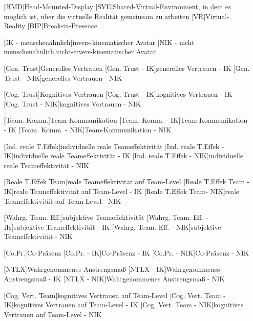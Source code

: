 \begin{acronym}
	[HMD]{Head-Mounted-Display}
	[SVE]{Shared-Virtual-Environment, in dem es möglich ist, über die virtuelle Realität gemeinsam zu arbeiten}
	[VR]{Virtual-Reality}
	[BIP]{Break-in-Presence}
	
	[IK - menschenähnlich]{invers-kinematischer Avatar}
	[NIK - nicht menschenähnlich]{nicht-invers-kinematischer Avatar}
	
	[Gen. Trust]{Generelles Vertrauen}
	[Gen. Trust - IK]{generelles Vertrauen - IK}
	[Gen. Trust - NIK]{generelles Vertrauen - NIK}
	
	[Cog. Trust]{Kognitives Vertrauen}
	[Cog. Trust - IK]{kognitives Vertrauen - IK}
	[Cog. Trust - NIK]{kognitives Vertrauen - NIK}
	
	[Team. Komm.]{Team-Kommunikation}
	[Team. Komm. - IK]{Team-Kommunikation - IK}
	[Team. Komm. - NIK]{Team-Kommunikation - NIK}
	
	[Ind. reale T.Effek]{individuelle reale Teameffektivität}
	[Ind. reale T.Effek - IK]{individuelle reale Teameffektivität - IK}
	[Ind. reale T.Effek - NIK]{individuelle reale Teameffektivität - NIK}	
	
	[Reale T.Effek Team]{reale Teameffektivität auf Team-Level}
	[Reale T.Effek Team - IK]{reale Teameffektivität auf Team-Level - IK}
	[Reale T.Effek Team- NIK]{reale Teameffektivität auf Team-Level - NIK}
	
	[Wahrg. Team. Eff.]{subjektive Teameffektivität}
	[Wahrg. Team. Eff. - IK]{subjektive Teameffektivität - IK}
	[Wahrg. Team. Eff. - NIK]{subjektive Teameffektivität - NIK}
	
	[Co.Pr.]{Co-Präsenz}
	[Co.Pr. - IK]{Co-Präsenz - IK}
	[Co.Pr. - NIK]{Co-Präsenz - NIK}
	
	[NTLX]{Wahrgenommenes Anstrengsmaß}
	[NTLX - IK]{Wahrgenommenes Anstrengsmaß - IK}
	[NTLX - NIK]{Wahrgenommenes Anstrengsmaß - NIK}
	
	[Cog. Vert. Team]{kognitives Vertrauen auf Team-Level}
	[Cog. Vert. Team - IK]{kognitives Vertrauen auf Team-Level - IK}
	[Cog. Vert. Team - NIK]{kognitives Vertrauen auf Team-Level - NIK}
	

\end{acronym}
